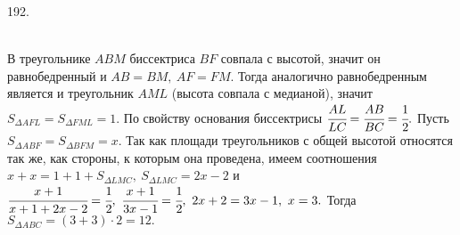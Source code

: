 192. \begin{figure}[ht!]
\end{figure}\\
В треугольнике $ABM$ биссектриса $BF$ совпала с высотой, значит он равнобедренный и $AB=BM,\ AF=FM.$ Тогда аналогично равнобедренным является и треугольник $AML$ (высота совпала с медианой), значит $S_{\Delta AFL}=S_{\Delta FML}=1.$ По свойству основания биссектрисы $\cfrac{AL}{LC}=\cfrac{AB}{BC}=\cfrac{1}{2}.$ Пусть $S_{\Delta ABF}=S_{\Delta BFM}=x.$ Так как площади треугольников с общей высотой относятся так же, как стороны, к которым она проведена, имеем соотношения
$x+x=1+1+S_{\Delta LMC},\ S_{\Delta LMC}=2x-2$ и $\cfrac{x+1}{x+1+2x-2}=\cfrac{1}{2},\ \cfrac{x+1}{3x-1}=\cfrac{1}{2},\ 2x+2=3x-1,\ x=3.$ Тогда $S_{\Delta ABC}=(3+3)\cdot2=12.$\\

